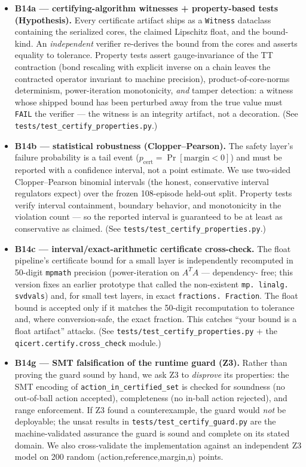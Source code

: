 \documentclass[conference,10pt]{IEEEtran}
\begin{document}
\begin{itemize}
\item \textbf{B14a --- certifying-algorithm witnesses + property-based tests
(Hypothesis).} Every certificate artifact ships as a \texttt{Witness} dataclass
containing the serialized cores, the claimed Lipschitz float, and the
bound-kind. An \emph{independent} verifier re-derives the bound from the cores
and asserts equality to tolerance. Property tests assert gauge-invariance of the
TT contraction (bond rescaling with explicit inverse on a chain leaves the
contracted operator invariant to machine precision), product-of-core-norms
determinism, power-iteration monotonicity, \emph{and} tamper detection: a
witness whose shipped bound has been perturbed away from the true value must
\texttt{FAIL} the verifier --- the witness is an integrity artifact, not a
decoration. (See \texttt{tests/test\_certify\_properties.py}.)

\item \textbf{B14b --- statistical robustness (Clopper--Pearson).} The safety
layer's failure probability is a tail event ($p_{\text{cert}} = \Pr[\text{margin}<0]$)
and must be reported with a confidence interval, not a point estimate. We use
two-sided Clopper--Pearson binomial intervals (the honest, conservative interval
regulators expect) over the frozen 108-episode held-out split. Property tests
verify interval containment, boundary behavior, and monotonicity in the
violation count --- so the reported interval is guaranteed to be at least as
conservative as claimed. (See \texttt{tests/test\_certify\_properties.py}.)

\item \textbf{B14c --- interval/exact-arithmetic certificate cross-check.} The
float pipeline's certificate bound for a small layer is independently recomputed
in 50-digit \texttt{mpmath} precision (power-iteration on $A^TA$ --- dependency-
free; this version fixes an earlier prototype that called the non-existent
\texttt{mp.\,linalg.\,svdvals}) and, for small test layers, in exact
\texttt{fractions.\,Fraction}. The float bound is accepted only if it matches
the 50-digit recomputation to tolerance and, where conversion-safe, the exact
fraction. This catches ``your bound is a float artifact'' attacks. (See
\texttt{tests/test\_certify\_properties.py} + the
\texttt{qicert.certify.cross\_check} module.)

\item \textbf{B14g --- SMT falsification of the runtime guard (Z3).} Rather than
proving the guard sound by hand, we ask Z3 to \emph{disprove} its properties: the
SMT encoding of \texttt{action\_in\_certified\_set} is checked for
soundness (no out-of-ball action accepted), completeness (no in-ball action
rejected), and range enforcement. If Z3 found a counterexample, the guard would
\emph{not} be deployable; the unsat results in
\texttt{tests/test\_certify\_guard.py} are the machine-validated assurance the
guard is sound and complete on its stated domain. We also cross-validate the
implementation against an independent Z3 model on 200 random
(action,reference,margin,n) points.


\end{itemize}
\end{document}
